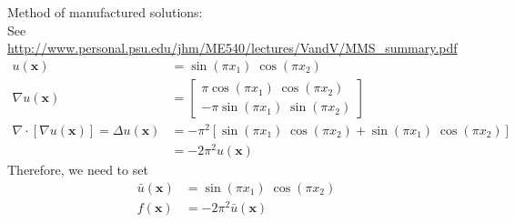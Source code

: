 \documentclass[11pt,answers]{exam}
\begin{document}
\begin{questions}

\begin{solution}
Method of manufactured solutions:\\
See \url{http://www.personal.psu.edu/jhm/ME540/lectures/VandV/MMS_summary.pdf}
\begin{align*}
u(\mathbf{x}) 
 &= \sin(\pi x_{1}) \; \cos(\pi x_{2}) \\
\nabla u(\mathbf{x}) 
 &=\begin{bmatrix}
 \pi \cos(\pi x_{1}) \; \cos(\pi x_{2}) \\
 -\pi \sin(\pi x_{1}) \; \sin(\pi x_{2})
 \end{bmatrix} \\
\nabla \cdot \left[ \nabla u(\mathbf{x}) \right]
  = \Delta u(\mathbf{x})  
 &= -\pi^{2} \left[ \sin(\pi x_{1}) \; \cos(\pi x_{2}) + \sin(\pi x_{1}) \; \cos(\pi x_{2}) \right] \\
 &= -2\pi^{2} u(\mathbf{x}) 
\end{align*}
Therefore, we need to set 
\begin{align*}
\bar{u}(\mathbf{x}) &= \sin(\pi x_{1}) \; \cos(\pi x_{2}) \\
f(\mathbf{x}) &= -2\pi^{2} \bar{u}(\mathbf{x}) 
\end{align*}
\end{solution}



\end{questions}
\end{document}
